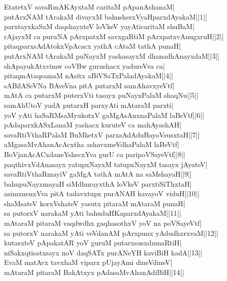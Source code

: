 \documentclass{article}
\begin{document}
EtatetxV savaRmAKAyxtaM caritaM pApanAshanaM|\\
putArxNAM tArakaM divayxM bahusherxVyaHparxdAyakaM||1||\\
parxtayxkaSxM daqshayxteV loVkeV yayAticaritaM shuBaM|\\
rAjayxM ca puruNA pArxpatxM savxgaRtiM pArxpatxvAnugxruH||2||\\
pitaqparxsAdAtokxVpAcacx yathA cAtaM tathA punaH|\\
putArxNAM tArakaM puNayxM yashasayxM dhanadhAnayxdaM||3||\\
shApayukAtxvimw coVBw gurushacx yadureVva ca|\\
pitaqmAtaqsamaM nAsitx aBiVSaTxPaladAyakaM||4||\\
sABilASeVNa BAveVna pitA putarxM samAhavxyeVtf|\\
mAtA ca putarxM puterxVti tasayx puNayxPalaM shaqNu||5||\\
samAhUtoV yadA putarxH parxyAti mAtaraM parxti|\\
yoV yAti haSaRMsaMyukotxV gaMgAsAnxnaPalaM laBeVtf||6||\\
pAdaparxkASxLanaM yashacx kuruteV ca mahAyashAH|\\
savaRtiVthaRPalaM BuMketxV parxsAdAduBayoVsusxtaH||7||\\
aMgasaMvAhanAcAcxtha ashavxmeVdhaPalaM laBeVtf|\\
BoVjanAcACxdaneYshecxYva gurU ca paripoVSayeVtf||8||\\
paqthivxVdAnasayx yatupxNayxM tatupxNayxM tasayx jAyateV|\\
savaRtiVthaRmayiV gaMgA tathA mAtA na saMshayaH||9||\\
bahupuNayxmayaH siMdhurayxthA loVkeV parxtiSiThxtaH|\\
asimxnenxVva pitA tadavxtupx purANAH kavayoV viduH||10||\\
shaMsateV korxVshateV yasutx pitaraM mAtaraM punaH|\\
sa putorxV narakaM yAti bahuduHKaparxdAyakaM||11||\\
mAtaraM pitaraM vaqdwdhx gaqhasothxV yoV na poVSayeVtf|\\
sa putorxV narakaM yAti veVdanAM pArxpunx yAdudhxrxvaM||12||\\
kutasxteV pApakatAR yoV guruM putarxsusxdumaRtiH|\\
niSakxqtisatxsayx noV daqSATx purANeYH kaviBiH kadA||13||\\
EvaM matAvx tavxhaM viparx pUjayAmi dineVdineV|\\
mAtaraM pitaraM BakAtxyx pAdasaMvAhanAdiBiH||14||\\
\end{document}
